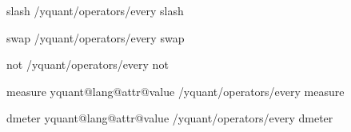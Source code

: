 \yquant@langhelper@declare@command@uncontrolled%
   {slash}%
   {}%
   {%
      \preto{}%
      \yquant@prepare%
         {}%
         {/yquant/operators/every slash}%
   }

\yquant@langhelper@declare@command%
   {swap}%
   \yquant@register@get@multiassingle
   {%
      \yquant@prepare%
         {}%
         {/yquant/operators/every swap}%
   }

\yquant@langhelper@declare@command%
   {not}%
   {}%
   {%
      \yquant@prepare%
         {}%
         {/yquant/operators/every not}%
   }

\yquant@langhelper@declare@command@uncontrolled%
   {measure}%
   \yquant@register@get@allowmultitrue%
   {%
      \ifdefined\yquant@lang@attr@type%
         \yquant@register@type@fromstring\yquant@lang@attr@type\yquant@circuit@settype@to%
      \else%
         \let\yquant@circuit@settype@to=\yquant@register@type@c%
      \fi%
      \let\yquant@prepare@callback@prepare=\yquant@circuit@settype@prepare%
      \let\yquant@prepare@callback@draw=\yquant@circuit@settype%
      \unless\ifcsname yquant@lang@attr@value\endcsname%
         \let\yquant@lang@attr@value=\empty%
      \fi%
      \expandafter\yquant@prepare%
         \expandafter{\yquant@lang@attr@value}%
         {/yquant/operators/every measure}%
   }

\yquant@langhelper@declare@command@uncontrolled%
   {dmeter}%
   \yquant@register@get@allowmultitrue%
   {%
      \ifdefined\yquant@lang@attr@type%
         \yquant@register@type@fromstring\yquant@lang@attr@type\yquant@circuit@settype@to%
      \else%
         \let\yquant@circuit@settype@to=\yquant@register@type@c%
      \fi%
      \let\yquant@prepare@callback@prepare=\yquant@circuit@settype@prepare%
      \let\yquant@prepare@callback@draw=\yquant@circuit@settype%
      \unless\ifcsname yquant@lang@attr@value\endcsname%
         \let\yquant@lang@attr@value=\empty%
      \fi%
      \expandafter\yquant@prepare%
         \expandafter{\yquant@lang@attr@value}%
         {/yquant/operators/every dmeter}%
   }

